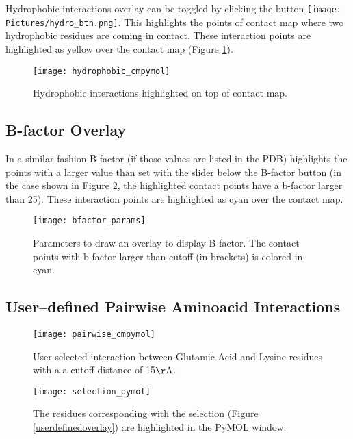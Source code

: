 \documentclass[11pt,fleqn]{book} %
\begin{document}
Hydrophobic interactions overlay can be toggled by clicking the button \texttt{[image: Pictures/hydro\_btn.png]}. This highlights the points of contact map where two hydrophobic residues are coming in contact. These interaction points are highlighted as {\color{yellowocre} yellow} over the contact map (Figure \ref{hydrophobicoverlay}).

\begin{figure}[ht!]
\centering
  \begin{minipage}{\textwidth}
  \centering
      \texttt{[image: hydrophobic\_cmpymol]}
      \caption{Hydrophobic interactions highlighted on top of contact map.}
  \label{hydrophobicoverlay}
  \end{minipage}
\end{figure}

\subsection{B-factor Overlay}

In a similar fashion B-factor (if those values are listed in the PDB) highlights the points with a larger value than set with the slider below the B-factor button (in the case shown in Figure \ref{bfactor_params}, the highlighted contact points have a b-factor larger than 25). These interaction points are highlighted as {\color{cyan} cyan} over the contact map.

\begin{figure}[ht!]
\centering
  \begin{minipage}{\textwidth}
  \centering
      \texttt{[image: bfactor\_params]}
      \caption{Parameters to draw an overlay to display B-factor. The contact points with b-factor larger than cutoff (in brackets) is colored in {\color{cyan} cyan}.}
  \label{bfactor_params}
  \end{minipage}
\end{figure}

\subsection{User--defined Pairwise Aminoacid Interactions}


\begin{figure}[ht!]
\centering
  \begin{minipage}[b]{0.45\textwidth}
  \centering
      \texttt{[image: pairwise\_cmpymol]}
      \caption{User selected interaction between Glutamic Acid and Lysine residues with a a cutoff distance of 15$\mathrm{\AA}$.}
  \label{userdefinedoverlay}
  \end{minipage}
  \quad
  \begin{minipage}[b]{0.45\textwidth}
  \centering
      \texttt{[image: selection\_pymol]}
      \caption{The residues corresponding with the selection (Figure \ref{userdefinedoverlay}) are highlighted in the PyMOL window.}
  \label{userdefinedoverlay_pymol}
  \end{minipage}
\end{figure}
\end{document}
